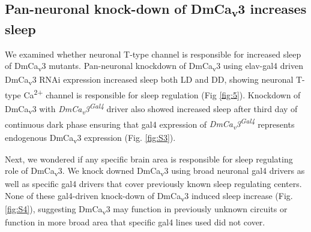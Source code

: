 \subsection*{Pan-neuronal knock-down of DmCa\textsubscript{v}3 increases sleep}

We examined whether neuronal T-type channel is responsible for increased sleep of DmCa\textsubscript{v}3 mutants.
Pan-neuronal knockdown of DmCa\textsubscript{v}3 using elav-gal4 driven DmCa\textsubscript{v}3 RNAi expression increased sleep both LD and DD, showing neuronal T-type Ca\textsuperscript{2+} channel is responsible for sleep regulation (Fig \ref{fig:5}).
Knockdown of DmCa\textsubscript{v}3 with \emph{DmCa\textsubscript{v}3\textsuperscript{Gal4}} driver also showed increased sleep after third day of continuous dark phase ensuring that gal4 expression of \emph{DmCa\textsubscript{v}3\textsuperscript{Gal4}} represents endogenous DmCa\textsubscript{v}3 expression (Fig. \ref{fig:S3}). 

Next, we wondered if any specific brain area is responsible for sleep regulating role of DmCa\textsubscript{v}3.
We knock downed DmCa\textsubscript{v}3 using broad neuronal gal4 drivers as well as specific gal4 drivers that cover previously known sleep regulating centers.
None of these gal4-driven knock-down of DmCa\textsubscript{v}3 induced sleep increase (Fig. \ref{fig:S4}), suggesting DmCa\textsubscript{v}3 may function in previously unknown circuits or function in more broad area that specific gal4 lines used did not cover.  
    
  